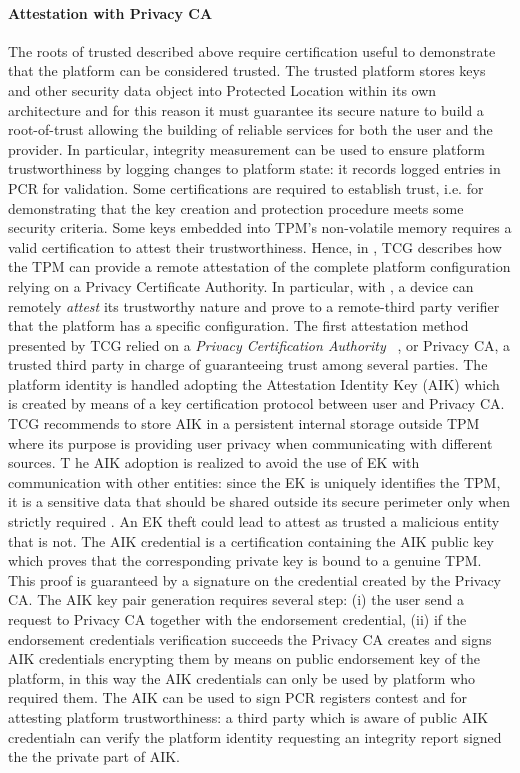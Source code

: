 \documentclass[../tesi.tex]{subfiles}
\begin{document}
\paragraph*{Attestation with Privacy CA}
The roots of trusted described above require certification useful to demonstrate that the platform can be considered trusted. The trusted platform stores keys and other security data object into Protected Location within its own architecture and for this reason it must guarantee its secure nature to build a root-of-trust allowing the building of reliable services for both the user and the provider.
In particular, integrity measurement can be used to ensure platform trustworthiness by logging changes to platform state: it records logged entries in PCR for validation. 
Some certifications are required to establish trust, i.e. for demonstrating that the key creation and protection procedure meets some security criteria. Some keys embedded into TPM's non-volatile memory requires a valid certification to attest their trustworthiness. 
Hence, in \cite{tcg2007specification}, TCG describes how the TPM can provide a remote attestation of the complete platform configuration relying on a Privacy Certificate Authority. 
In particular, with \tpm{}, a device can remotely {\em attest} its trustworthy nature
and prove to a remote-third party verifier that the platform has a specific configuration. 
%
The first attestation method presented by TCG relied on a {\em Privacy Certification Authority}~ \cite{tcg2007specification}, or Privacy CA, a trusted third party in charge of guaranteeing trust among several parties. The platform identity is handled adopting the Attestation Identity Key (AIK) which is created by means of a key certification protocol between user and Privacy CA. 
TCG recommends to store AIK in a persistent internal storage outside TPM where its purpose is providing user privacy when communicating with different sources. T
he AIK adoption is realized to avoid the use of EK with communication with other entities: since the EK is uniquely identifies the TPM, it is a sensitive data that should be shared outside its secure perimeter only when strictly required . An EK theft could lead to attest as trusted a malicious entity that is not. The AIK credential is a certification containing the AIK public key which proves that the corresponding private key is bound to a genuine TPM. This proof
is guaranteed by a signature on the credential created by the Privacy CA. The AIK key pair generation requires several step: (i) the user send a request to Privacy CA together with the endorsement credential, (ii) if the endorsement credentials verification succeeds the Privacy CA creates and signs AIK credentials encrypting them by means on public endorsement key of the platform, in this way the AIK credentials can only be used by platform who required them.
The AIK can be used to sign PCR registers contest and for attesting platform trustworthiness: a third party which is aware of public AIK credentialn can verify the platform identity requesting an integrity report signed the the private part of AIK. 
\end{document}
